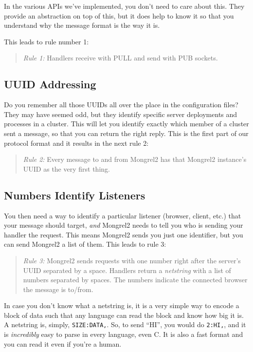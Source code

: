 In the various APIs we've implemented, you don't need to care about this.
They provide an abstraction on top of this, but it does help to know it
so that you understand why the message format is the way it is.

This leads to rule number 1:

\begin{quote}
\emph{Rule 1:} Handlers receive with PULL and send with PUB sockets.
\end{quote}

\subsection{UUID Addressing}

Do you remember all those UUIDs all over the place in the configuration files?
They may have seemed odd, but they identify specific server deployments and
processes in a cluster.  This will let you identify exactly which member of a
cluster sent a message, so that you can return the right reply.  This is the
first part of our protocol format and it results in the next rule 2:

\begin{quote}
\emph{Rule 2:} Every message to and from Mongrel2 has that Mongrel2 instance's
UUID as the very first thing.
\end{quote}

\subsection{Numbers Identify Listeners}

You then need a way to identify a particular listener (browser, client, etc.)
that your message should target, \emph{and} Mongrel2 needs to tell you who is
sending your handler the request.  This means Mongrel2 sends you just one
identifier, but you can send Mongrel2 a list of them.  This leads to rule 3:

\begin{quote}
\emph{Rule 3:} Mongrel2 sends requests with one number right after the server's
UUID separated by a space.  Handlers return a \emph{netstring} with a list of
numbers separated by spaces.  The numbers indicate the connected browser the
message is to/from.
\end{quote}

In case you don't know what a netstring is, it is a very simple way to encode a
block of data such that any language can read the block and know how big it is.
A netstring is, simply, \verb|SIZE:DATA,|. So, to send ``HI'', you would do
\verb|2:HI,|, and it is \emph{incredibly} easy to parse in every language, even
C.  It is also a fast format and you can read it even if you're a human.


